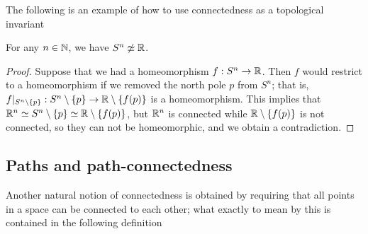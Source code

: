 The following is an example of how to use connectedness as a topological invariant
\begin{prop}
  For any $n \in \mathbb{N}$, we have $S^n \not\simeq \mathbb{R}$.
\end{prop}
\begin{proof}
  Suppose that we had a homeomorphism $f : S^n \to \mathbb{R}$. Then $f$ would restrict to a homeomorphism if we removed the north pole $p$ from $S^n$; that is, $f|_{S^n \setminus \{p \}} : S^n \setminus \{p\} \to \mathbb{R} \setminus \{f(p)\}$ is a homeomorphism. This implies that $\mathbb{R}^n \simeq S^n \setminus \{p\} \simeq \mathbb{R} \setminus \{f(p)\}$, but $\mathbb{R}^n$ is connected while $\mathbb{R} \setminus \{f(p)\}$ is not connected, so they can not be homeomorphic, and we obtain a contradiction.
\end{proof}

\subsection{Paths and path-connectedness}
Another natural notion of connectedness is obtained by requiring that all points in a space can be connected to each other; what exactly to mean by this is contained in the following definition


